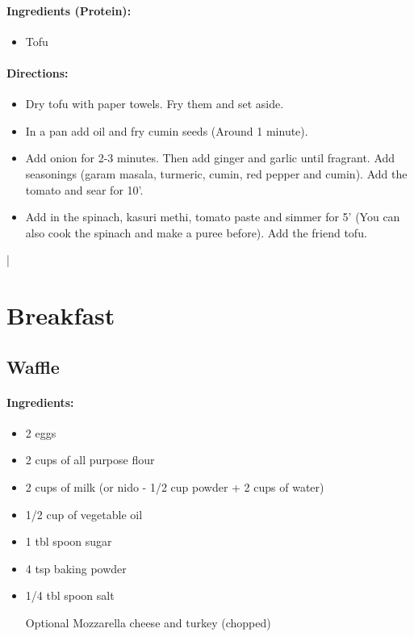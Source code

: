 \documentclass{article}
\begin{document}
\paragraph{Ingredients (Protein):}
\begin{itemize}
\item Tofu
\end{itemize}

\paragraph{Directions:}
\begin{itemize}
\item Dry tofu with paper towels. Fry them and set aside.
\item In a pan add oil and fry cumin seeds (Around 1 minute). \item Add onion for 2-3 minutes. Then add ginger and garlic until fragrant. Add seasonings (garam masala, turmeric, cumin, red pepper and cumin). Add the tomato and sear for 10'.

\item Add in the spinach, kasuri methi, tomato paste and simmer for 5' (You can also cook the spinach and make a puree before). Add the friend tofu. 
\end{itemize}|

\section{Breakfast}

\subsection{Waffle}

\paragraph{Ingredients:}

\begin{itemize}
	\item 2 eggs
	\item 2 cups of all purpose flour
	\item 2 cups of milk (or nido - 1/2 cup powder + 2 cups of water)
	\item 1/2 cup of vegetable oil
	\item 1 tbl spoon sugar
	\item 4 tsp baking powder
	\item 1/4 tbl spoon salt
	\item [Optional] Mozzarella cheese and turkey (chopped)
\end{itemize}
\end{document}
